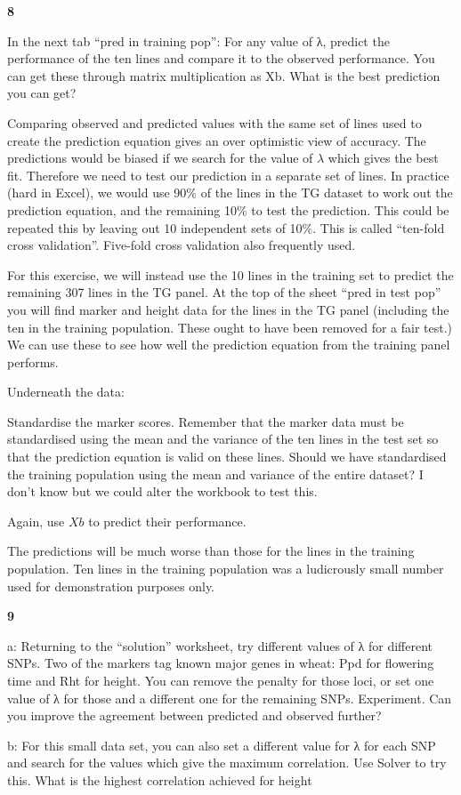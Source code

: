 \documentclass[
]{book}
\makeatletter
\newenvironment{kframe}{%
\medskip{}
\setlength{\fboxsep}{.8em}
 \def\at@end@of@kframe{}%
 \ifinner\ifhmode%
  \def\at@end@of@kframe{\end{minipage}}%
  \begin{minipage}{\columnwidth}%
 \fi\fi%
 \def\FrameCommand##1{\hskip\@totalleftmargin \hskip-\fboxsep
 \colorbox{shadecolor}{##1}\hskip-\fboxsep
     \hskip-\linewidth \hskip-\@totalleftmargin \hskip\columnwidth}%
 \MakeFramed {\advance\hsize-\width
   \@totalleftmargin\z@ \linewidth\hsize
   \@setminipage}}%
 {\par\unskip\endMakeFramed%
 \at@end@of@kframe}
\newenvironment{rmdblock}[1]
  {
  \begin{itemize}
  \renewcommand{\labelitemi}{
    \raisebox{-.7\height}[0pt][0pt]{
      {\setkeys{Gin}{width=3em,keepaspectratio}\texttt{[image: images/\#1]}}
    }
  }
  \setlength{\fboxsep}{1em}
  \begin{kframe}
  \item
  }
  {
  \end{kframe}
  \end{itemize}
  }
\newenvironment{rmdquiz}
  {\begin{rmdblock}{quiz}}
  {\end{rmdblock}}
\makeatother
\begin{document}
\begin{rmdquiz}
\textbf{8}

In the next tab ``pred in training pop'': For any value of λ, predict the performance of the ten lines and compare it to the observed performance. You can get these through matrix multiplication as Xb. What is the best prediction you can get?
\end{rmdquiz}

Comparing observed and predicted values with the same set of lines used to create the prediction equation gives an over optimistic view of accuracy. The predictions would be biased if we search for the value of \(λ\) which gives the best fit. Therefore we need to test our prediction in a separate set of lines. In practice (hard in Excel), we would use 90\% of the lines in the TG dataset to work out the prediction equation, and the remaining 10\% to test the prediction. This could be repeated this by leaving out 10 independent sets of 10\%. This is called ``ten-fold cross validation''. Five-fold cross validation also frequently used.

For this exercise, we will instead use the 10 lines in the training set to predict the remaining 307 lines in the TG panel. At the top of the sheet ``pred in test pop'' you will find marker and height data for the lines in the TG panel (including the ten in the training population. These ought to have been removed for a fair test.) We can use these to see how well the prediction equation from the training panel performs.

Underneath the data:

Standardise the marker scores. Remember that the marker data must be standardised using the mean and the variance of the ten lines in the test set so that the prediction equation is valid on these lines. Should we have standardised the training population using the mean and variance of the entire dataset? I don't know but we could alter the workbook to test this.

Again, use \(Xb\) to predict their performance.

The predictions will be much worse than those for the lines in the training population. Ten lines in the training population was a ludicrously small number used for demonstration purposes only.

\begin{rmdquiz}
\textbf{9}

a: Returning to the ``solution'' worksheet, try different values of λ for different SNPs. Two of the markers tag known major genes in wheat: Ppd for flowering time and Rht for height. You can remove the penalty for those loci, or set one value of λ for those and a different one for the remaining SNPs. Experiment. Can you improve the agreement between predicted and observed further?

b: For this small data set, you can also set a different value for λ for each SNP and search for the values which give the maximum correlation. Use Solver to try this. What is the highest correlation achieved for height
\end{rmdquiz}
\end{document}

